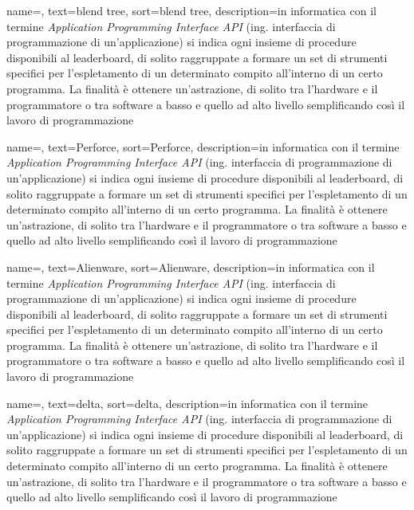 {
	name=,
	text=blend tree,
	sort=blend tree,
	description={in informatica con il termine \emph{Application Programming Interface API} (ing. interfaccia di programmazione di un'applicazione) si indica ogni insieme di procedure disponibili al leaderboard, di solito raggruppate a formare un set di strumenti specifici per l'espletamento di un determinato compito all'interno di un certo programma. La finalità è ottenere un'astrazione, di solito tra l'hardware e il programmatore o tra software a basso e quello ad alto livello semplificando così il lavoro di programmazione}
}

{
	name=,
	text=Perforce,
	sort=Perforce,
	description={in informatica con il termine \emph{Application Programming Interface API} (ing. interfaccia di programmazione di un'applicazione) si indica ogni insieme di procedure disponibili al leaderboard, di solito raggruppate a formare un set di strumenti specifici per l'espletamento di un determinato compito all'interno di un certo programma. La finalità è ottenere un'astrazione, di solito tra l'hardware e il programmatore o tra software a basso e quello ad alto livello semplificando così il lavoro di programmazione}
}

{
	name=,
	text=Alienware,
	sort=Alienware,
	description={in informatica con il termine \emph{Application Programming Interface API} (ing. interfaccia di programmazione di un'applicazione) si indica ogni insieme di procedure disponibili al leaderboard, di solito raggruppate a formare un set di strumenti specifici per l'espletamento di un determinato compito all'interno di un certo programma. La finalità è ottenere un'astrazione, di solito tra l'hardware e il programmatore o tra software a basso e quello ad alto livello semplificando così il lavoro di programmazione}
}

{
	name=,
	text=delta,
	sort=delta,
	description={in informatica con il termine \emph{Application Programming Interface API} (ing. interfaccia di programmazione di un'applicazione) si indica ogni insieme di procedure disponibili al leaderboard, di solito raggruppate a formare un set di strumenti specifici per l'espletamento di un determinato compito all'interno di un certo programma. La finalità è ottenere un'astrazione, di solito tra l'hardware e il programmatore o tra software a basso e quello ad alto livello semplificando così il lavoro di programmazione}
}

